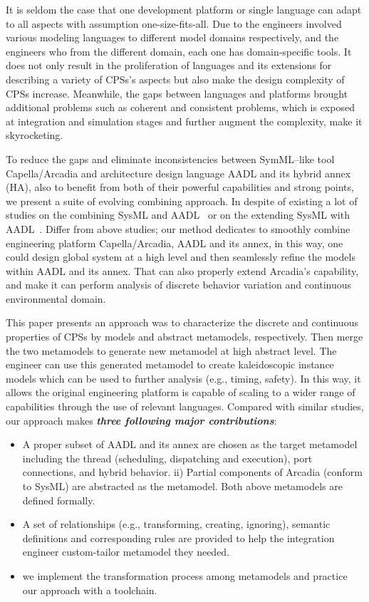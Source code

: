 It is seldom the case that one development platform or single language can adapt to all aspects with assumption one-size-fits-all. Due to the engineers involved various modeling languages to different model domains respectively, and the engineers who from the different domain, each one has domain-specific tools. It does not only result in the proliferation of languages and its extensions for describing a variety of CPSs's aspects but also make the design complexity of CPSs increase. Meanwhile, the gaps between languages and platforms brought additional problems such as coherent and consistent problems, which is exposed at integration and simulation stages and further augment the complexity, make it skyrocketing. 
 
To reduce the gaps and eliminate inconsistencies between SymML--like tool Capella/Arcadia and architecture design language AADL and its hybrid annex (HA), also to benefit from both of their powerful capabilities and strong points, we present a suite of evolving combining approach. In despite of existing a lot of studies on the combining SysML and AADL~\cite{de2012combining} or on the extending SysML with AADL~\cite{behjati2011extending}. Differ from above studies; our method dedicates to smoothly combine engineering platform Capella/Arcadia, AADL and its annex, in this way, one could design global system at a high level and then seamlessly refine the models within AADL and its annex. That can also properly extend Arcadia's capability, and make it can perform analysis of discrete behavior variation and continuous environmental domain.    


This paper presents an approach was to characterize the discrete and continuous properties of CPSs by models and abstract metamodels, respectively. Then merge the two metamodels to generate new metamodel at high abstract level. The engineer can use this generated metamodel to create kaleidoscopic instance models which can be used to further analysis (e.g., timing, safety). In this way,  it allows the original engineering platform is capable of scaling to a wider range of capabilities through the use of relevant languages. Compared with similar studies, our approach makes \textbf{\textit{three following major contributions}}:

\begin{itemize}
    \item A proper subset of AADL and its annex are chosen as the target metamodel including the thread (scheduling, dispatching and execution), port connections, and hybrid behavior. ii) Partial components of Arcadia (conform to SysML) are abstracted as the metamodel. Both above metamodels are defined formally.
    \item A set of relationships (e.g., transforming, creating, ignoring), semantic definitions and corresponding rules are provided to help the integration engineer custom-tailor metamodel they needed. 
    \item we implement the transformation process among metamodels and practice our approach with a toolchain.   
\end{itemize}

